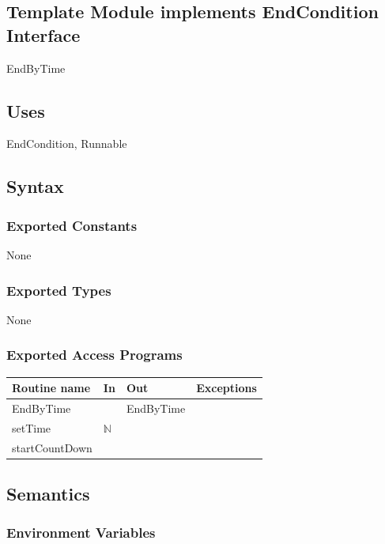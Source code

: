 \documentclass[12pt]{article}
\begin{document}
\subsection* {Template Module implements EndCondition Interface}

EndByTime

\subsection*{Uses}

EndCondition, Runnable

\subsection* {Syntax}

\subsubsection*{Exported Constants}

None

\subsubsection*{Exported Types}

None

\subsubsection* {Exported Access Programs}

\begin{tabular}{| l | l | l | p{6cm} |}
\hline
\textbf{Routine name} & \textbf{In} & \textbf{Out} & \textbf{Exceptions}\\
\hline
EndByTime & ~ & EndByTime    & \\
\hline
setTime & $\mathbb{N}$ & ~ & \\
\hline
startCountDown & ~ & ~ & \\
\hline
\end{tabular}

\subsection* {Semantics}

\subsubsection*{Environment Variables}
\end{document}

